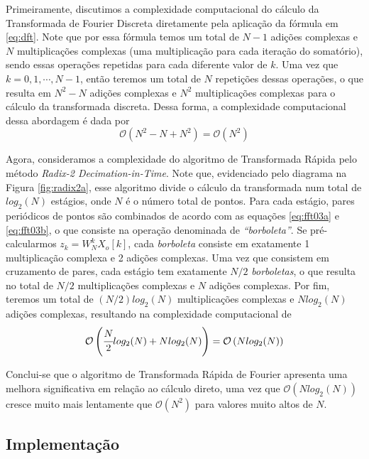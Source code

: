\documentclass[a4paper,11pt]{article}
\numberwithin{figure}{section}
\numberwithin{equation}{section}
\numberwithin{table}{section}
\theoremstyle{definition}
\begin{document}
Primeiramente, discutimos a complexidade computacional do cálculo da Transformada de Fourier Discreta diretamente pela aplicação da fórmula em \eqref{eq:dft}. Note que por essa fórmula temos um total de $N-1$ adições complexas e $N$ multiplicações complexas (uma multiplicação para cada iteração do somatório), sendo essas operações repetidas para cada diferente valor de $k$. Uma vez que $k = 0, 1, \cdots, N-1$, então teremos um total de $N$ repetições dessas operações, o que resulta em $N^2-N$ adições complexas e $N^2$ multiplicações complexas para o cálculo da transformada discreta. Dessa forma, a complexidade computacional dessa abordagem é dada por
\begin{equation}
	\mathcal{O}\left( N^2-N + N^2 \right) = \mathcal{O}\left( N^2 \right)
\end{equation} 

Agora, consideramos a complexidade do algoritmo de Transformada Rápida pelo método \textit{Radix-2 Decimation-in-Time}. Note que, evidenciado pelo diagrama na Figura \ref{fig:radix2a}, esse algoritmo divide o cálculo da transformada num total de $log_2(N)$ estágios, onde $N$ é o número total de pontos. Para cada estágio, pares periódicos de pontos são combinados de acordo com as equações \eqref{eq:fft03a} e \eqref{eq:fft03b}, o que consiste na operação denominada de \textit{``borboleta''}. Se pré-calcularmos $z_k = W_N^k X_o[k]$, cada \textit{borboleta} consiste em exatamente 1 multiplicação complexa e 2 adições complexas. Uma vez que consistem em cruzamento de pares, cada estágio tem exatamente $N/2$ \textit{borboletas}, o que resulta no total de $N/2$ multiplicações complexas e $N$ adições complexas. Por fim, teremos um total de $(N/2)log_2(N)$ multiplicações complexas e $N log_2(N)$ adições complexas, resultando na complexidade computacional de
\begin{equation}
	\mathcal{O}\left( \cfrac{N}{2} log_2(N) + N log_2(N) \right) = \mathcal{O}\left( N log_2(N) \right)
\end{equation} 

Conclui-se que o algoritmo de Transformada Rápida de Fourier apresenta uma melhora significativa em relação ao cálculo direto, uma vez que $\mathcal{O}\left( N log_2(N) \right)$ cresce muito mais lentamente que $\mathcal{O}\left( N^2 \right)$ para valores muito altos de $N$. 

\subsection{Implementação}
\end{document}
